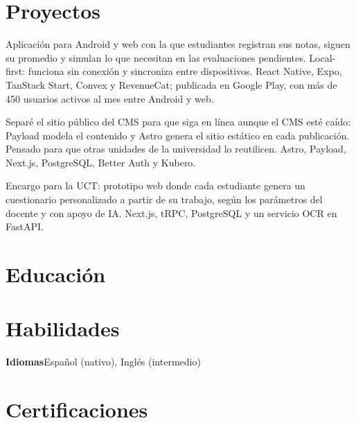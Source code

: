 \documentclass[spanish]{cv}
\begin{document}
\section{Proyectos}
Aplicación para Android y web con la que estudiantes registran sus
notas, siguen su promedio y simulan lo que necesitan en las
evaluaciones pendientes. Local-first: funciona sin conexión y
sincroniza entre dispositivos. React Native, Expo, TanStack Start,
Convex y RevenueCat; publicada en Google Play, con más de 450
usuarios activos al mes entre Android y web.

Separé el sitio público del CMS para que siga en línea aunque el CMS
esté caído: Payload modela el contenido y Astro genera el sitio
estático en cada publicación. Pensado para que otras unidades de la
universidad lo reutilicen. Astro, Payload, Next.js, PostgreSQL, Better
Auth y Kubero.

Encargo para la UCT: prototipo web donde cada estudiante genera un
cuestionario personalizado a partir de su trabajo, según los
parámetros del docente y con apoyo de IA. Next.js, tRPC, PostgreSQL y
un servicio OCR en FastAPI.

\section{Educación}

\section{Habilidades}

\vspace{4pt}\noindent\textbf{Idiomas}\cvdot Español (nativo), Inglés
(intermedio)

\section{Certificaciones}
\end{document}
